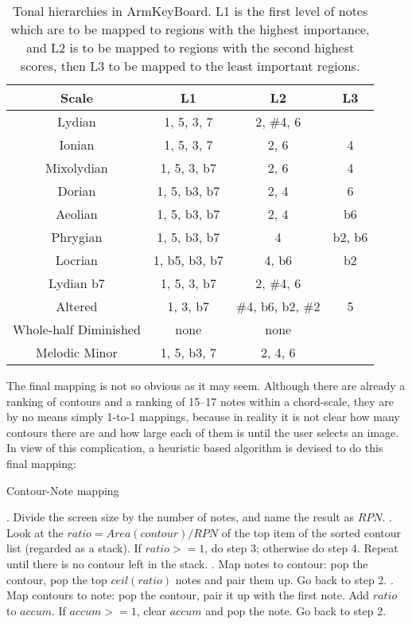 \begin{table}
\centering
\begin{tabular}{|c|c|c|c|} \hline
Scale & L1 & L2 & L3\\ \hline
Lydian & 1, 5, 3, 7& 2, \#4, 6 & \\ \hline
Ionian & 1, 5, 3, 7& 2, 6 & 4\\ \hline
Mixolydian & 1, 5, 3, b7 & 2, 6 & 4\\ \hline
Dorian & 1, 5, b3, b7& 2, 4 & 6\\ \hline
Aeolian & 1, 5, b3, b7& 2, 4 & b6\\ \hline
Phrygian & 1, 5, b3, b7& 4 & b2, b6\\ \hline
Locrian & 1, b5, b3, b7& 4, b6 & b2\\ \hline
Lydian b7 & 1, 5, 3, b7& 2, \#4, 6 &\\ \hline
Altered & 1, 3, b7& \#4, b6, b2, \#2 & 5\\ \hline
Whole-half Diminished & none & none &\\ \hline
Melodic Minor & 1, 5, b3, 7& 2, 4, 6 &\\ \hline
\end{tabular}
\caption{Tonal hierarchies in ArmKeyBoard. L1 is the first level of notes which are to be mapped to regions with the highest importance, and L2 is to be mapped to regions with the second highest scores, then L3 to be mapped to the least important regions.}
\label{tab:5-tonalhierarchy}
\end{table}

The final mapping is not so obvious as it may seem. Although there are already a ranking of contours and a ranking of 15--17 notes within a chord-scale, they are by no means simply 1-to-1 mappings, because in reality it is not clear how many contours there are and how large each of them is until the user selects an image. In view of this complication, a heuristic based algorithm is devised to do this final mapping:
\begin{algorithm}
\caption{Contour-Note mapping}
\begin{algorithmic}
. Divide the screen size by the number of notes, and name the result as $RPN$.
. Look at the $ ratio = Area(contour) / RPN $ of the top item of the sorted contour list (regarded as a stack). If $ratio>=1$, do step	3; otherwise do step 4. Repeat until there is no contour left in the stack.
. Map notes to contour: pop the contour, pop the top $ ceil(ratio)$ notes and pair them up. Go back to step 2.
. Map contours to note: pop the contour, pair it up with the first	note. Add $ratio$ to $accum$. If $accum>=1$, clear $accum$ and pop the note. Go back to step 2.
\end{algorithmic}
\end{algorithm}


